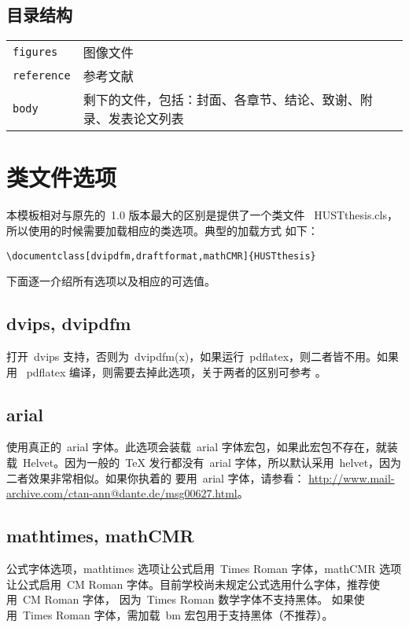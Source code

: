\subsection{目录结构}

\begin{tabular}{l l}
\texttt{figures} & 图像文件\\
\texttt{reference} & 参考文献\\
\texttt{body} & 剩下的文件，包括：封面、各章节、结论、致谢、附录、发表论文列表\\
\end{tabular}

\section{类文件选项}
\label{sec:options}

本模板相对与原先的~1.0 版本最大的区别是提供了一个类文件~
HUSTthesis.cls，所以使用的时候需要加载相应的类选项。典型的加载方式
如下：

\verb|\documentclass[dvipdfm,draftformat,mathCMR]{HUSTthesis}|

\noindent 下面逐一介绍所有选项以及相应的可选值。

\subsection{dvips, dvipdfm}

打开~dvips
支持，否则为~dvipdfm(x)，如果运行~pdflatex，则二者皆不用。如果用
~pdflatex 编译，则需要去掉此选项，关于两者的区别可参考
。

\subsection{arial}

使用真正的~arial 字体。此选项会装载~arial
字体宏包，如果此宏包不存在，就装载~Helvet。因为一般的~\TeX{}
发行都没有~arial
字体，所以默认采用~helvet，因为二者效果非常相似。如果你执着的
要用~arial 字体，请参看：
\url{http://www.mail-archive.com/ctan-ann@dante.de/msg00627.html}。

\subsection{mathtimes, mathCMR}

公式字体选项，mathtimes 选项让公式启用~Times Roman 字体，mathCMR
选项让公式启用~CM Roman
字体。目前学校尚未规定公式选用什么字体，推荐使用~CM Roman 字体，
因为~Times Roman 数学字体不支持黑体。 如果使用~Times Roman
字体，需加载~bm 宏包用于支持黑体（不推荐）。

